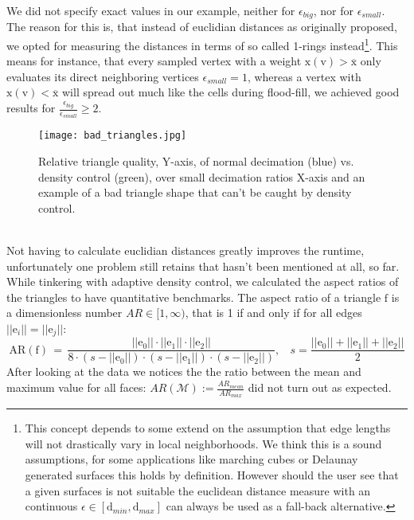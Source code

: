 We did not specify exact values in our example, neither for $\epsilon_{big}$, nor for $\epsilon_{small}$.
The reason for this is, that instead of euclidian distances as originally proposed, we opted for measuring the distances in terms of so called 1-rings instead\footnote{ This concept depends to some extend on the assumption that edge lengths will not drastically vary in local neighborhoods. We think this is a sound assumptions, for some applications like marching cubes or Delaunay generated surfaces this holds by definition. However should the user see that a given surfaces is not suitable the euclidean distance measure with an continuous $\epsilon \in [\mathrm{d}_{min}, \mathrm{d}_{max}]$ can always be used as a fall-back alternative.}.
This means for instance, that every sampled vertex with a weight $\mathrm{x}(\mathrm{v}) > \overline{\mathrm{x}}$ only evaluates its direct neighboring vertices $\epsilon_{small} = 1$, whereas a vertex with $\mathrm{x}(\mathrm{v}) < \overline{\mathrm{x}}$ will spread out much like the cells during flood-fill, we achieved good results for $\frac{\epsilon_{big}}{\epsilon_{small}} \geq 2$.
\begin{figure}[ht]
\centering
\texttt{[image: bad\_triangles.jpg]}
\caption{Relative triangle quality, Y-axis, of normal decimation (blue) vs. density control (green), over small decimation ratios X-axis and an example of a bad triangle shape that can't be caught by density control.}
\label{fig:bad_triangles}
\end{figure}\\
Not having to calculate euclidian distances greatly improves the runtime, unfortunately one problem still retains that hasn't been mentioned at all, so far.
While tinkering with adaptive density control, we calculated the aspect ratios of the triangles to have quantitative benchmarks.
The aspect ratio of a triangle $\mathrm{f}$ is a dimensionless number $AR \in [1, \infty)$, that is 1 if and only if for all edges $||\mathrm{e}_{i}|| = ||\mathrm{e}_{j}||$:
\begin{equation} \label{eq:aspect_ratio}
\mathrm{AR}(\mathrm{f}) \,=\, \frac{||\mathrm{e}_{0}|| \cdot ||\mathrm{e}_{1}|| \cdot ||\mathrm{e}_{2}||}{8 \cdot (s-||\mathrm{e}_{0}||) \cdot (s-||\mathrm{e}_{1}||) \cdot (s-||\mathrm{e}_{2}||)}, ~~~~ s = \frac{||\mathrm{e}_{0}|| + ||\mathrm{e}_{1}|| + ||\mathrm{e}_{2}||}{2}
\end{equation}
After looking at the data we notices the the ratio between the mean and maximum value for all faces: $AR(\mathcal{M}) := \frac{AR_{mean}}{AR_{max}}$ did not turn out as expected.
